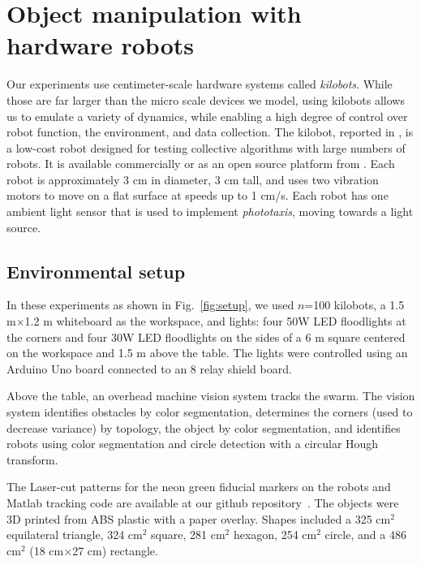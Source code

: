 
\section{Object manipulation with hardware robots}\label{sec:realExperiment}
Our experiments use centimeter-scale hardware systems called \emph{kilobots}.  While those are far larger than the micro scale devices we model, using kilobots allows us to emulate a variety of dynamics, while enabling a high degree of control over robot function, the environment, and data collection. The kilobot, reported in \cite{Rubenstein2012,rubenstein2014programmable}, is a low-cost robot designed for testing collective algorithms with large numbers of robots. It is available commercially or as an open source platform from \cite{K-Team2015}.  Each robot is approximately 3 cm in diameter, 3 cm tall, and uses two vibration motors to move on a flat surface at speeds up to 1 cm/s.  Each robot has one ambient light sensor that is used to implement \emph{phototaxis},  moving towards a light source. 

  
\subsection{Environmental setup}  
In these experiments as shown in Fig.~\ref{fig:setup}, we used $n$=100 kilobots, a 1.5 m$\times$1.2 m whiteboard as the workspace, and lights: four 50W LED floodlights  at the corners and four 30W LED floodlights on the sides of a 6 m square centered on the workspace and 1.5 m above the table. The lights were controlled using an Arduino Uno board connected to an 8 relay shield board.  

Above the table, an overhead machine vision system tracks the swarm. The vision system identifies obstacles by color segmentation, determines the corners  (used to decrease  variance)  by topology, the object by color segmentation, and identifies robots using color segmentation and circle detection with a circular Hough transform.

The Laser-cut patterns for the neon green fiducial markers on the robots and {\sc Matlab} tracking code are available at our github repository~\cite{Shahrokhi2015GitHubShapeControl}. 
The objects were 3D printed from ABS plastic with a paper overlay. 
Shapes included a 325 cm$^2$ equilateral triangle, 
 324 cm$^2$ square,
 281 cm$^2$ hexagon,
254 cm$^2$ circle, 
and a 486 cm$^2$ (18 cm$\times$27 cm)  rectangle.

